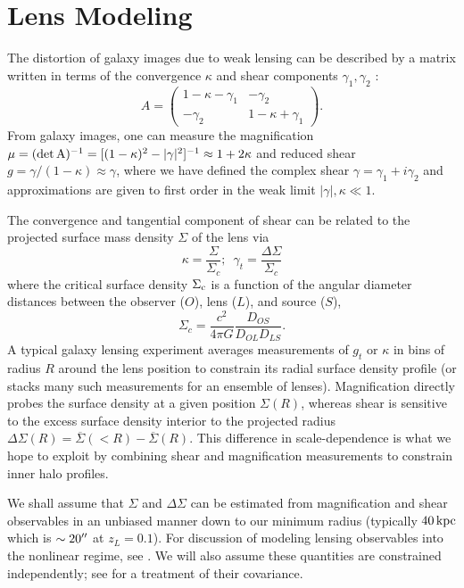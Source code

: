 \documentclass[12pt]{emulateapj}
\begin{document}
\section{Lens Modeling}

The distortion of galaxy images due to weak lensing can be described
by a matrix written in terms of the convergence $\kappa$ and shear
components $\gamma_1, \gamma_2$ \citep[e.g.][]{Bartelmann2001}:
\begin{equation}
A = \left( \begin{array}{cc}
1 - \kappa -\gamma_1 & -\gamma_2 \\
-\gamma_2 & 1 - \kappa + \gamma_1 \end{array} \right).
\end{equation}
From galaxy images, one can measure the magnification 
$\mu = (\rm{det}\,A)^{-1} = [(1-\kappa)^2 - |\gamma|^2]^{-1} \approx 1+2\kappa$
and reduced shear $g = \gamma / (1-\kappa) \approx \gamma$, where we have defined the
complex shear $\gamma=\gamma_1 + i\gamma_2$ and approximations are
given to first order in the weak limit $|\gamma|,\kappa \ll 1$.

The convergence and tangential component of shear can be related to the
projected surface mass density $\Sigma$ of the lens via
\begin{equation}
\kappa = \frac{\Sigma}{\Sigma_c}; \,\,\, \gamma_t = \frac{\Delta\Sigma}{\Sigma_c}
\end{equation}
where the critical surface density $\Sigma_{\rm  c}$ is a function of
the angular diameter distances between the observer ($O$), lens ($L$),
and source ($S$),
\begin{equation}
\Sigma_{c}=\frac{c^2}{4\pi G}\frac{D_{OS}}{D_{OL}D_{LS}}.
\end{equation}
A typical galaxy lensing experiment averages measurements of $g_t$ or $\kappa$ in
bins of radius $R$ around the lens position to constrain its radial
surface density profile (or stacks many such measurements for an
ensemble of lenses). Magnification directly probes the surface density
at a given position $\Sigma(R)$, whereas shear is sensitive to the
excess surface density interior to the projected radius
$\Delta\Sigma(R) = \overline{\Sigma}(<R) - \overline{\Sigma}(R)$. This
difference in scale-dependence is what we hope to exploit by combining
shear and magnification measurements to constrain inner halo profiles.

We shall assume that $\Sigma$ and $\Delta\Sigma$ can be estimated from
magnification and shear observables in an unbiased manner down to our
minimum radius (typically $40\,\rm{kpc}$ which is $\sim20\mbox{$^{\prime\prime}$}$ at
$z_L=0.1$). For discussion of modeling lensing observables into the
nonlinear regime, see \citet{Menard2003, Takada2003,
  Mandelbaum2006}. We will also assume these quantities are
constrained independently; see \citet{Rozo2010} for a treatment of
their covariance.
\end{document}
